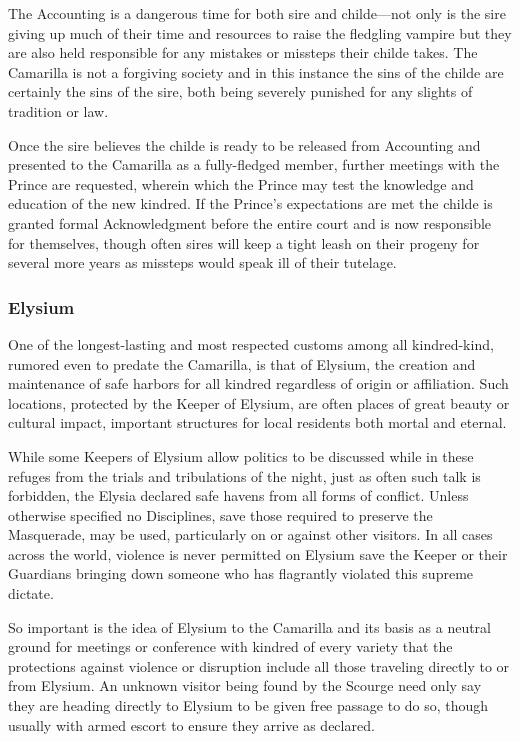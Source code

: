The Accounting is a dangerous time for both sire and childe---not only is the sire 
giving up much of their time and resources to raise the fledgling vampire but they 
are also held responsible for any mistakes or missteps their childe takes.  The 
Camarilla is not a forgiving society and in this instance the sins of the childe 
are certainly the sins of the sire, both being severely punished for any slights of 
tradition or law.

Once the sire believes the childe is ready to be released from Accounting and 
presented to the Camarilla as a fully-fledged member, further meetings with the 
Prince are requested, wherein which the Prince may test the knowledge and education 
of the new kindred.  If the Prince's expectations are met the childe is granted 
formal Acknowledgment before the entire court and is now responsible for 
themselves, though often sires will keep a tight leash on their progeny for 
several more years as missteps would speak ill of their tutelage.

\subsubsection{Elysium}
One of the longest-lasting and most respected customs among all kindred-kind, 
rumored even to predate the Camarilla, is that of Elysium, the creation and maintenance 
of safe harbors for all kindred regardless of origin or affiliation.  Such locations, 
protected by the Keeper of Elysium, are often places of great beauty or cultural impact, 
important structures for local residents both mortal and eternal.

While some Keepers of Elysium allow politics to be discussed while in these 
refuges from the trials and tribulations of the night, just as often such talk is 
forbidden, the Elysia declared safe havens from all forms of conflict.  Unless 
otherwise specified no Disciplines, save those required to preserve the 
Masquerade, may be used, particularly on or against other visitors.  In all cases 
across the world, violence is never permitted on Elysium save the Keeper or their 
Guardians bringing down someone who has flagrantly violated this supreme dictate.

So important is the idea of Elysium to the Camarilla and its basis as a neutral 
ground for meetings or conference with kindred of every variety that the 
protections against violence or disruption include all those traveling directly to 
or from Elysium.  An unknown visitor being found by the Scourge need only say they 
are heading directly to Elysium to be given free passage to do so, though usually 
with armed escort to ensure they arrive as declared.

